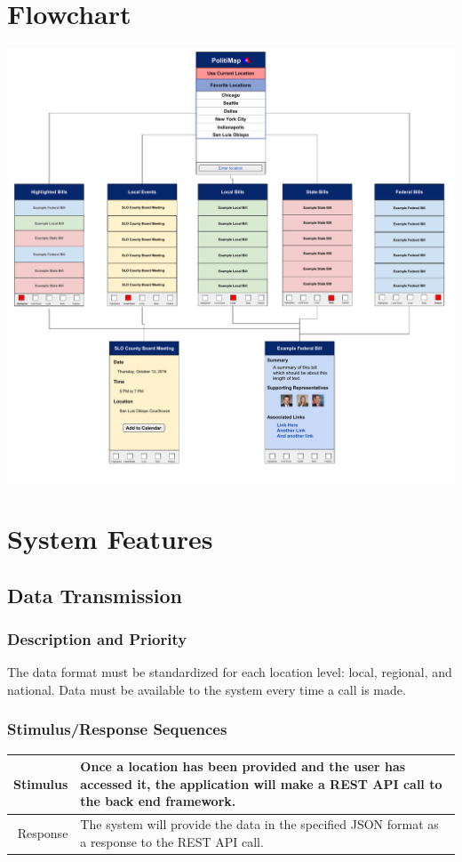\documentclass[12pt,oneside,letterpaper]{article}
\newcounter{use_case}
\begin{document}
\section{Flowchart}
\includegraphics[width=\textwidth]{flowchart.pdf}

\section{System Features}

\subsection{Data Transmission}
\subsubsection{Description and Priority}
The data format must be standardized for each location level: local, regional,
and national. Data must be available to the system every time a call
is made.

\subsubsection{Stimulus/Response Sequences}
\begin{longtabu}{|r|X|}
  \hline
  Stimulus & Once a location has been provided and the user has accessed it, the application will make a REST API call to the back end framework.\\
  \hline
  Response & The system will provide the data in the specified JSON format as a response to the REST API call.\\
  \hline
\end{longtabu}
\end{document}
